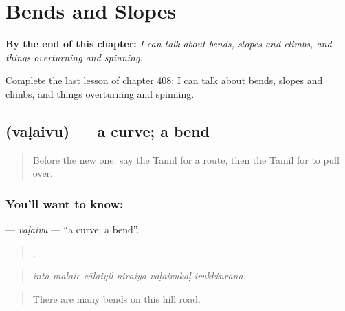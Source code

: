 
\chapter{Bends and Slopes}
\label{ch:ta-bends-and-slopes}

\begin{chapteropening}
\textbf{By the end of this chapter:} \emph{I can talk about bends, slopes and climbs, and things overturning and spinning.}

Complete the last lesson of chapter 408: I can talk about bends, slopes and climbs, and things overturning and spinning.
\end{chapteropening}

\section[\texorpdfstring{\ta{வளைவு} (vaḷaivu)}{வளைவு (vaḷaivu)}]{ (vaḷaivu) — a curve; a bend}

\label{lesson:TA-C408-valaivu}



\begin{quote}
Before the new one: say the Tamil for a route, then the Tamil for to pull over.
\end{quote}

\subsection*{You'll want to know: }
\textbf{} — \emph{vaḷaivu} — \textquotedblleft{}a curve; a bend\textquotedblright{}.

\begin{quote}
     .
\end{quote}

\begin{quote}
\emph{inta malaic cālaiyil niṟaiya vaḷaivukaḷ irukkiṉṟaṉa.}
\end{quote}

\begin{quote}
There are many bends on this hill road.
\end{quote}

